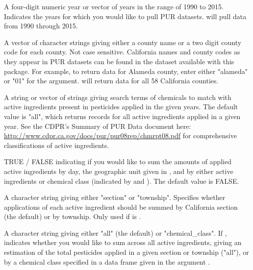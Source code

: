 \documentclass[a4paper]{book}
\begin{document}
\begin{Arguments}
\begin{ldescription}
\item[\code{years}] A four-digit numeric year or vector of years in the range of
1990 to 2015. Indicates the years for which you would like to pull PUR
datasets.  will pull data from 1990 through 2015.

\item[\code{counties}] A vector of character strings giving either a county name or
a two digit county code for each county. Not case sensitive. California names
and county codes as they appear in PUR datasets can be found in the
 dataset available with this package. For example, to
return data for Alameda county, enter either "alameda" or "01" for the
 argument.  will return data for
all 58 California counties.

\item[\code{chemicals}] A string or vector of strings giving search terms of
chemicals to match with active ingredients present in pesticides applied in
the given years. The default value is "all", which returns records for all
active ingredients applied in a given year. See the CDPR's Summary of PUR
Data document here:
\url{http://www.cdpr.ca.gov/docs/pur/pur08rep/chmrpt08.pdf} for
comprehensive classifications of active ingredients.

\item[\code{sum\_application}] TRUE / FALSE indicating if you would like to sum the
amounts of applied active ingredients by day, the geographic unit
given in , and by either active ingredients or chemical class
(indicated by  and ). The default value
is FALSE.

\item[\code{unit}] A character string giving either "section" or "township".
Specifies whether applications of each active ingredient should be summed
by California section (the default) or by township. Only used if
 is .

\item[\code{sum}] A character string giving either "all" (the
default) or "chemical\_class". If ,
 indicates whether you would like to sum across all active
ingredients, giving an estimation of the total pesticides applied in a
given section or township ("all"), or by a chemical class specified in a
data frame given in the argument .


\end{ldescription}
\end{Arguments}
\end{document}
